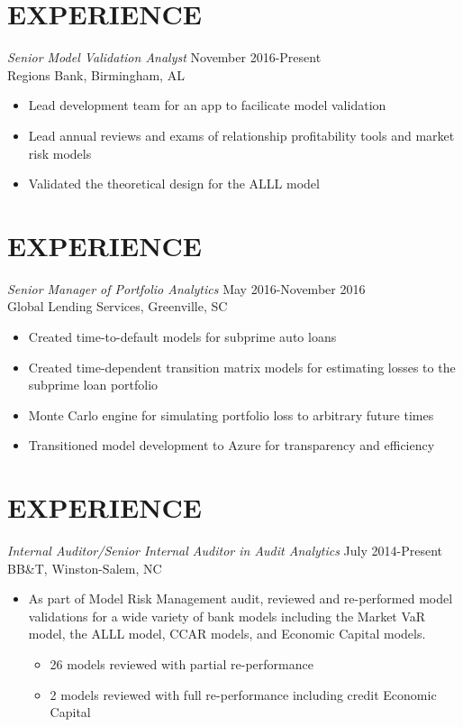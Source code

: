 \documentclass{res}
\begin{document}
\begin{resume}
\section{EXPERIENCE} {\sl Senior Model Validation Analyst} \hfill November 2016-Present \\
Regions Bank, Birmingham, AL
\begin{itemize}
\item Lead development team for an app to facilicate model validation
\item Lead annual reviews and exams of relationship profitability tools and market risk models 
\item Validated the theoretical design for the ALLL model

\end{itemize}

\section{EXPERIENCE} {\sl Senior Manager of Portfolio Analytics} \hfill May 2016-November 2016 \\
Global Lending Services, Greenville, SC

\begin{itemize}
\item Created time-to-default models for subprime auto loans
\item Created time-dependent transition matrix models for estimating losses to the subprime loan portfolio
\item Monte Carlo engine for simulating portfolio loss to arbitrary future times
\item Transitioned model development to Azure for transparency and efficiency
\end{itemize}

\section{EXPERIENCE} {\sl Internal Auditor/Senior Internal Auditor in Audit Analytics} \hfill July 2014-Present \\
BB\&T, Winston-Salem, NC

 \begin{itemize}  %
                 \item As part of Model Risk Management audit, reviewed and re-performed model validations for a wide variety of bank models including the Market VaR model, the ALLL model, CCAR models, and Economic Capital models.
                 \begin{itemize}
                 \item 26 models reviewed with partial re-performance
                 \item 2 models reviewed with full re-performance including credit Economic Capital 
                 \end{itemize}
                 

\end{itemize}
\end{resume}
\end{document}

